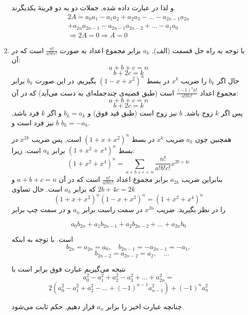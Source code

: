 \begin{enumerate}
    	و لذا در عبارت داده شده, جملات دو به دو قرینهٔ یکدیگرند.
    	\begin{align*}
    		2A = a_0a_1 - a_1a_2 + a_2a_3 - \dots - a_{2n-1}a_{2n}\\
    		+ a_{2n}a_{2n-1} - a_{2n-1}a_{2n-2} +\dots - a_1a_0 \\
    		\Rightarrow 2A = 0 \Rightarrow A = 0
    	\end{align*}
	
	\item
        \p
    	با توجه به راه حل قسمت (الف), $a_k$ برابر مجموع اعداد به صورت $\frac{n!}{a!b!c!}$ است که در آن:
    	$$a + b + c = n$$ 
    	$$b + 2c = k$$
    	 حال اگر $b_k$ را ضریب $x^k$ در بسط $(1 - x + x^2)^n$ بگیریم, در این صورت $b_k$ برابر مجموع اعداد $\frac{(-1)^bn!}{a!b!c!}$ است (طبق قضیه‌ی چندجمله‌ای  به دست می‌آید) که در آن:
    	 $$a + b + c =  n$$ 
    	 $$b + 2c = k$$
    	 پس اگر $k$ زوج باشد, $b$ نیز زوج است (طبق قید فوق) و $b_k = a_k$ و اگر $k$ فرد باشد, $b$ نیز فرد است و $b_k = -a_k$.
    	 
        \p
        همچنین چون $a_k$ ضریب $x^k$ در بسط $(1 + x + x^2)^n$ است, پس ضریب $x^{2k}$ در بسط $(1 + x^2 + x^4)^n$ برابر $a_k$ است. زیرا:
         $$(1+x^2+x^4)^n=\sum_{a+b+c=n} \frac{n!}{a!b!c!} x^{2b+4c}$$
         بنابراین ضریب $a_{2k}$ برابر مجموع اعداد $\frac{n!}{a!b!c!}$ است که در آن $a+b+c=n$ و $2b+4c=2k$ که برابر $a_k$ است. حال تساوی
        $$(1 + x + x^2)^n(1 - x + x^2)^n = (1 + x^2 + x^4)^n$$
        را در نظر بگیرید. ضریب $x^{2n}$ در سمت راست برابر $a_n$ و در سمت چپ برابر
        
        $$a_0b_{2n} + a_1b_{2n - 1} + a_2b_{2n - 2} + \dots + a_{2n}b_0$$
        
        است. با توجه به اینکه
        $$b_{2n} = a_{2n} = a_0,\quad b_{2n - 1} = -a_{2n - 1} = -a_1,$$
        $$\quad b_{2n - 2} = a_{2n - 2} = a_2,\quad \dots$$
    	
        نتیجه می‌گیریم عبارت فوق برابر است با
        $$a_0^2 - a_1^2 + a_2^2 - a_3^2 + \dots + a_{2n}^2 = $$
        $$2(a_0^2 - a_1^2 + a_2^2 - \dots + (-1)^{n - 1}a_{n - 1}^2) + (-1)^n a_n^2$$
    	
        چنانچه عبارت اخیر را برابر $a_n$ قرار دهیم, حکم ثابت می‌شود.
        
        
	\end{enumerate}
